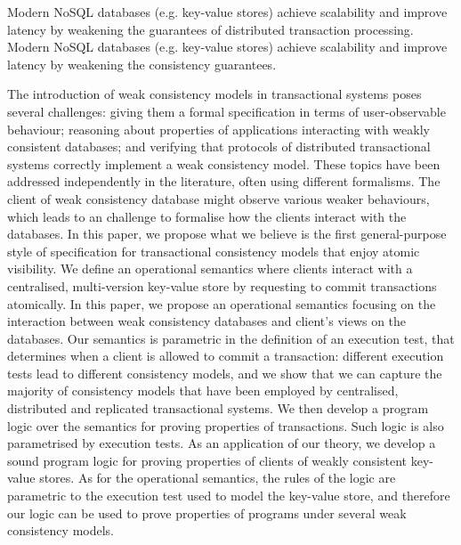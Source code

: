 \ac{Modern NoSQL databases (e.g. key-value stores) achieve scalability and improve 
latency by weakening the guarantees of distributed transaction 
processing. }
Modern NoSQL databases (e.g. key-value stores) achieve scalability and improve 
latency by weakening the consistency guarantees. 

\ac{
The introduction of weak consistency models in transactional systems 
poses several challenges: giving them a formal specification in terms 
of user-observable behaviour; reasoning about properties of applications 
interacting with weakly consistent databases; and verifying that protocols 
of distributed transactional systems correctly implement a weak consistency model. 
These topics have been addressed independently in the literature, often using 
different formalisms. }
The client of weak consistency database might observe various weaker behaviours,
which leads to an challenge to formalise how the clients interact with the databases.
\ac{
In this paper, we propose what we believe is the first general-purpose style 
of specification for transactional consistency models that enjoy atomic visibility. 
We define an operational semantics where clients interact with a centralised, 
multi-version key-value store by requesting to commit transactions atomically. }
In this paper, we propose an operational semantics focusing on the interaction between 
weak consistency databases and client's views on the databases.
Our semantics is parametric in the definition of an execution test, that determines 
when a client is allowed to commit a transaction: different execution tests lead 
to different consistency models, and we show that we can capture the majority 
of consistency models that have been employed by centralised, distributed and replicated 
transactional systems. 
We then develop a program logic over the semantics for proving properties of transactions.
Such logic is also parametrised by execution tests.
\ac{
As an application of our theory, we develop a sound program logic for 
proving properties of clients of weakly consistent key-value stores. 
As for the operational semantics, the rules of the logic are parametric to the execution 
test used to model the key-value store, and therefore our logic can be used 
to prove properties of programs under several weak consistency models.}


